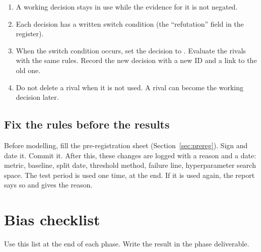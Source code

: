 \documentclass[11pt]{article}
\begin{document}
\begin{center}
\end{center}

\begin{enumerate}
  \item A working decision stays in use while the evidence for it is not negated.
  \item Each decision has a written switch condition (the ``refutation'' field in the register).
  \item When the switch condition occurs, set the decision to \sRefuted. Evaluate the rivals with the same rules. Record the new decision with a new ID and a link to the old one.
  \item Do not delete a rival when it is not used. A rival can become the working decision later.
\end{enumerate}

\subsection{Fix the rules before the results}
Before modelling, fill the pre-registration sheet (Section~\ref{sec:prereg}). Sign and date it. Commit it.
After this, these changes are logged with a reason and a date: metric, baseline, split date, threshold method, failure line, hyperparameter search space.
The test period is used one time, at the end. If it is used again, the report says so and gives the reason.

\section{Bias checklist}
Use this list at the end of each phase. Write the result in the phase deliverable.
\end{document}
